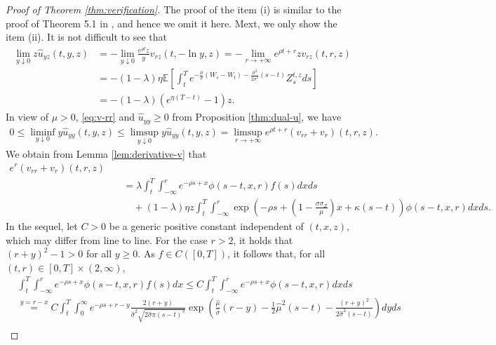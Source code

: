 \documentclass[11pt,times,letter]{article}
\numberwithin{equation}{section}
\begin{document}
\begin{proof}[Proof of Theorem \ref{thm:verification}]
The proof of the item  (i) is similar to the proof of Theorem 5.1 in \cite {BoLiaoYu21}, and hence we omit it here. Mext, we only show the item (ii). It is not difficult to see that
\begin{align}\label{eq:theta-1}
\lim_{y\downarrow 0}z \hat{u}_{yz}(t,y,z)&=-\lim_{y\downarrow 0}\frac{e^{\rho t}z}{y}v_{rz}(t,-\ln y,z)=-\lim_{r\to +\infty}e^{\rho t+r}zv_{rz}(t,r,z)\nonumber\\
&=-(1-\lambda)\eta\mathbb{E}\left[\int_t^{T} e^{-\frac{\mu}{\sigma}\left(W_s-W_t\right)-\frac{\mu^2}{2\sigma^2}(s-t)}  Z_s^{t,z}ds\right]\nonumber\\
&=-(1-\lambda)\left(e^{\eta (T-t)}-1\right)z.
\end{align}
In view of $\mu>0$, \eqref{eq:v-rr} and $\hat{u}_{yy}\geq 0$ from Proposition \ref{thm:dual-u}, we have 
\begin{align}\label{eq:estimate-theta-1}
0\leq\liminf_{y\downarrow 0} y\hat{u}_{yy}(t,y,z)\leq \limsup_{y\downarrow 0} y\hat{u}_{yy}(t,y,z)=\limsup_{r\to +\infty} e^{\rho t+r}(v_{rr}+v_r)(t,r,z).
\end{align}
We obtain from Lemma \ref{lem:derivative-v} that
\begin{align}\label{eq:estimate-theta-2}
e^{r}(v_{rr}+v_r)(t,r,z)\nonumber\\
&\quad=\lambda \int_{t}^{T}\int_{-\infty}^{r} e^{-\rho s+x}\phi(s-t,x,r)f(s)dx ds\\
&\qquad +(1-\lambda)\eta z\int_{t}^{T}\int_{-\infty}^{r} \exp\left(-\rho s+\left(1-\frac{\sigma\sigma_Z}{\mu}\right)x+\kappa(s-t)\right) \phi(s-t,x,r)dx ds.\nonumber
\end{align}
In the sequel, let $C>0$ be a generic positive constant independent of $(t,x,z)$, which may differ from line to line. For the case $r>2$, it holds that $(r+y)^2-1>0$ for all $y\geq0$. As $f\in C([0,T])$, it follows that, for all $(t,r)\in[0,T]\times (2,\infty)$,
\begin{align}\label{eq:estimate-theta-3}
&\int_{t}^{T}\int_{-\infty}^{r} e^{-\rho s+x}\phi(s-t,x,r)f(s)dx\leq C \int_{t}^{T}\int_{-\infty}^{r} e^{-\rho s+x}\phi(s-t,x,r)dx ds\nonumber\\
&\overset{y=r-x}{=}C\int_{t}^{T}\int_{0}^{\infty} e^{-\rho s+r-y}\frac{2( r+y)}{\hat{\sigma}^2\sqrt{2\hat{\sigma} \pi (s-t)^3}}\exp\left(\frac{\hat{\mu}}{\hat{\sigma}}(r-y)-\frac{1}{2} \hat{\mu}^2 (s-t)-\frac{( r+y)^2}{2\hat{\sigma}^2 (s-t)}\right)dyds\nonumber\\

\end{align}
\end{proof}
\end{document}
